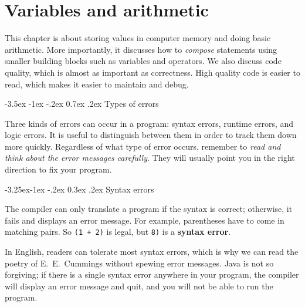\documentclass[12pt]{book}
\makeatletter
\renewcommand{\section}{\@startsection {section}{1}{\z@}%
    {-3.5ex \@plus -1ex \@minus -.2ex}%
    {0.7ex \@plus.2ex}%
    {\normalfont\Large\bfseries}}
\renewcommand\subsection{\@startsection{subsection}{2}{\z@}%
    {-3.25ex\@plus -1ex \@minus -.2ex}%
    {0.3ex \@plus .2ex}%
    {\normalfont\large\bfseries}}
\theoremstyle{exercise}
\newcommand{\java}[1]{\lstinline{#1}} %
\makeatother
\begin{document}
\chapter{Variables and arithmetic}

This chapter is about storing values in computer memory and doing basic arithmetic.
More importantly, it discusses how to {\em compose} statements using smaller building blocks such as variables and operators.
We also discuss code quality, which is almost as important as correctness.
High quality code is easier to read, which makes it easier to maintain and debug.



\section{Types of errors}


Three kinds of errors can occur in a program: syntax errors, runtime errors, and logic errors.
It is useful to distinguish between them in order to track them down more quickly.
Regardless of what type of error occurs, remember to {\em read and think about the error messages carefully}.
They will usually point you in the right direction to fix your program.

\subsection{Syntax errors}


The compiler can only translate a program if the syntax is correct; otherwise, it fails and displays an error message.
For example, parentheses have to come in matching pairs.
So \java{(1 + 2)} is legal, but \java{8)} is a {\bf syntax error}.

In English, readers can tolerate most syntax errors, which is why we can read the poetry of E.\ E.\ Cummings without spewing error messages.
Java is not so forgiving; if there is a single syntax error anywhere in your program, the compiler will display an error message and quit, and you will not be able to run the program.
\end{document}
